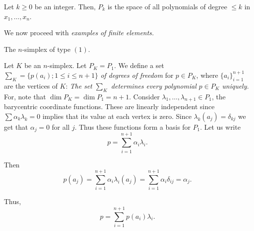 \begin{definition}\label{chap4-defi4.3}
Let $k\geq 0$ be an integer. Then, $P_{k}$ is the space of all
polynomials of degree $\leq k$ in $x_{1},\ldots,x_{n}$.
\end{definition}

We now proceed with {\em examples of finite elements.}

\begin{example}\label{chap4-exam4.1}
The $n$-simplex of type $(1)$.
\end{example}

Let $K$ be an $n$-simplex. Let $P_{K}=P_{1}$. We define a set
$\sum_{K}=\{p(a_{i}); 1\leq i\leq n+1\}$ {\em of degrees of freedom}
for $p\in P_{K}$, where $\{a_{i}\}^{n+1}_{i=1}$ are the vertices of
$K$: {\em The set $\sum_{K}$ determines every polynomial $p\in P_{K}$
  uniquely.} For, note that $\dim P_{K}=\dim P_{1}=n+1$. Consider
$\lambda_{1},\ldots,\lambda_{n+1}\in P_{1}$, the barycentric
coordinate functions. These are linearly independent since $\sum
\alpha_{k}\lambda_{k}=0$ implies that its value at each vertex is
zero. Since $\lambda_{k}(a_{j})=\delta_{kj}$ we get that
$\alpha_{j}=0$ for all $j$. Thus these functions form a basis for
$P_{1}$. Let us write
$$
p=\sum^{n+1}_{i=1}\alpha_{i}\lambda_{i}.
$$ 

Then
$$
p(a_{j})=\sum^{n+1}_{i=1}\alpha_{i}\lambda_{i}(a_{j})=\sum^{n+1}_{i=1}\alpha_{i}\delta_{ij}=\alpha_{j}. 
$$

Thus,
\begin{equation*}
p=\sum^{n+1}_{i=1}p(a_{i})\lambda_{i}.\tag{4.4}\label{chap4-eq4.4} 
\end{equation*}

